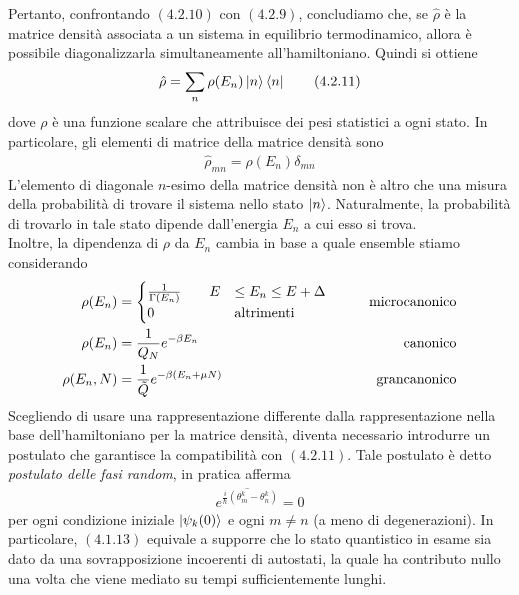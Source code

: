 \documentclass{article}
\begin{document}
Pertanto, confrontando $(4.2.10)$ con $(4.2.9)$, concludiamo che, se $\hat{\rho}$ è la matrice densità associata a un sistema in equilibrio termodinamico, allora è possibile diagonalizzarla simultaneamente all'hamiltoniano. Quindi si ottiene
\begin{align}
    \hat{\rho} = \sum_n \rho(E_n)\ket{n}\bra{n} \tag{4.2.11}
\end{align}
dove $\rho$ è una funzione scalare che attribuisce dei pesi statistici a ogni stato. In particolare, gli elementi di matrice della matrice densità sono
\begin{align}
    \hat{\rho}_{mn} = \rho(E_n)\delta_{mn} \tag{4.2.12}
\end{align}
L'elemento di diagonale $n$-esimo della matrice densità non è altro che una misura della probabilità di trovare il sistema nello stato $\ket{n}$. Naturalmente, la probabilità di trovarlo in tale stato dipende dall'energia $E_n$ a cui esso si trova. \\
Inoltre, la dipendenza di $\rho$ da $E_n$ cambia in base a quale ensemble stiamo considerando
\begin{align}
    \rho(E_n) &= \begin{cases}
        \frac{1}{\Gamma(E_n)} \qquad E &\leq E_n \leq E + \Delta \\
        0 \qquad &\text{altrimenti}
    \end{cases} \qquad &\text{microcanonico} \notag \\
    \rho(E_n) &= \frac{1}{Q_N}e^{-\beta E_n} \qquad &\text{canonico} \notag \\
    \rho(E_n, N) &= \frac{1}{\tilde{Q}}e^{-\beta(E_n + \mu N)} \qquad &\text{grancanonico} \notag 
\end{align}
Scegliendo di usare una rappresentazione differente dalla rappresentazione nella base dell'hamiltoniano per la matrice densità, diventa necessario introdurre un postulato che garantisce la compatibilità con $(4.2.11)$. Tale postulato è detto \textit{postulato delle fasi random}, in pratica afferma
\begin{align}
    \overline{e^{\frac{i}{\hbar}(\theta^k_m - \theta^k_n)}} = 0 \tag{4.2.13}
\end{align}
per ogni condizione iniziale $\ket{\psi_k(0)}$ e ogni $m \neq n$ (a meno di degenerazioni). In particolare, $(4.1.13)$ equivale a supporre che lo stato quantistico in esame sia dato da una sovrapposizione incoerenti di autostati, la quale ha contributo nullo una volta che viene mediato su tempi sufficientemente lunghi.
\end{document}
